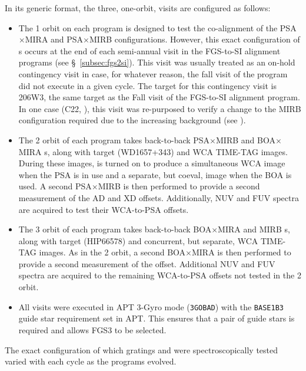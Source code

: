 In its generic format, the three, one-orbit, visits are configured as follows:
\begin{itemize}
	\item{The 1 orbit on each program is designed to test the co-alignment of the PSA$\times$MIRA and PSA$\times$MIRB  configurations.
However, this exact configuration of s occurs at the end of each semi-annual visit in the FGS-to-SI alignment programs (see \S~\ref{subsec:fgs2si}).
This visit was usually treated as an on-hold contingency visit in case, for whatever reason, the fall visit of the program did not execute in a given cycle.
The target for this contingency visit is 206W3, the same target as the Fall visit of the FGS-to-SI alignment program.
In one case (C22, ), this visit was re-purposed to verify a change to the MIRB  configuration required due to the increasing background (see ).}
	\item{The 2 orbit of each program takes back-to-back PSA$\times$MIRB and BOA$\times$MIRA s, along with target (WD1657+343) and WCA TIME-TAG images.
	During these images, \plamptwo{} is turned on to produce a simultaneous WCA image when the PSA is in use and a separate, but coeval, image when the BOA is used.
	A second PSA$\times$MIRB  is then performed to provide a second measurement of the AD and XD offsets.
	Additionally, NUV and FUV spectra are acquired to test their WCA-to-PSA offsets.}
	\item{The 3 orbit of each program takes back-to-back BOA$\times$MIRA and MIRB s, along with target (HIP66578) and concurrent, but separate, WCA TIME-TAG images.
	As in the 2 orbit, a second BOA$\times$MIRA  is then performed to provide a second measurement of the offset.
	Additional NUV and FUV spectra are acquired to the remaining WCA-to-PSA offsets not tested in the 2 orbit.}
	\item{All visits were executed in APT 3-Gyro mode (\texttt{3GOBAD}) with the \texttt{BASE1B3} guide star requirement set in APT. This ensures that a pair of guide stars is required and allows FGS3 to be selected.}
\end{itemize}
The exact configuration of which gratings and \cenwaves{} were spectroscopically tested varied with each cycle as the programs evolved.
